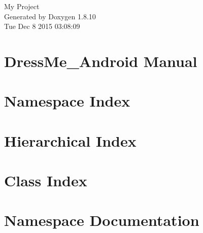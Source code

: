 \documentclass[twoside]{book}
\newcommand{\+}{\discretionary{\mbox{\scriptsize$\hookleftarrow$}}{}{}}
\newcommand{\clearemptydoublepage}{%
  \newpage{\pagestyle{empty}\cleardoublepage}%
}
\begin{document}
\hypersetup{pageanchor=false,
             bookmarks=true,
             bookmarksnumbered=true,
             pdfencoding=unicode
            }
\begin{titlepage}
\vspace*{7cm}
\begin{center}%
{\Large My Project }\\
\vspace*{1cm}
{\large Generated by Doxygen 1.8.10}\\
\vspace*{0.5cm}
{\small Tue Dec 8 2015 03:08:09}\\
\end{center}
\end{titlepage}
\clearemptydoublepage
\tableofcontents
\clearemptydoublepage
{}
\hypersetup{pageanchor=true}

\chapter{Dress\+Me\+\_\+\+Android Manual}
\label{index}\hypertarget{index}{}
\chapter{Namespace Index}

\chapter{Hierarchical Index}

\chapter{Class Index}

\chapter{Namespace Documentation}


\end{document}
